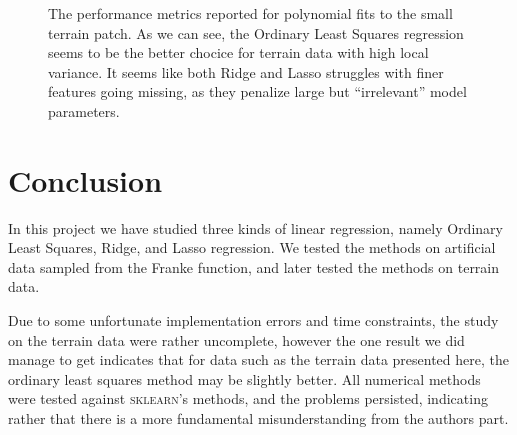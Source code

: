 \documentclass[dvipsnames, article, a4paper, oneside, 12pt]{memoir}
\begin{document}
	
  \begin{figure}[htpb]
  	\centering
	\caption{The performance metrics reported for polynomial fits to the
	small terrain patch. As we can see, the Ordinary Least Squares
regression seems to be the better chocice for terrain data with high local
variance. It seems like both Ridge and Lasso struggles with finer features
going missing, as they penalize large but ``irrelevant'' model parameters.}%
	\label{fig:terrain_metrics}
  \end{figure}

  \chapter{Conclusion}

  In this project we have studied three kinds of linear regression, namely
  Ordinary Least Squares, Ridge, and Lasso regression.  We tested the methods
  on artificial data sampled from the Franke function, and later tested the
  methods on terrain data.

  Due to some unfortunate implementation errors and time constraints, the study
  on the terrain data were rather uncomplete, however the one result we did
  manage to get indicates that for data such as the terrain data presented
  here, the ordinary least squares method may be slightly better. All numerical
  methods were tested against \textsc{sklearn}'s methods, and the problems
  persisted, indicating rather that there is a more fundamental
  misunderstanding from the authors part. 
\end{document}

